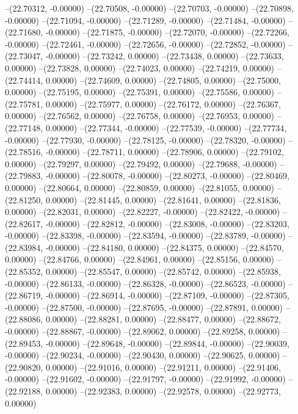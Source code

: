 --(22.70312, -0.00000)
--(22.70508, -0.00000)
--(22.70703, -0.00000)
--(22.70898, -0.00000)
--(22.71094, -0.00000)
--(22.71289, -0.00000)
--(22.71484, -0.00000)
--(22.71680, -0.00000)
--(22.71875, -0.00000)
--(22.72070, -0.00000)
--(22.72266, -0.00000)
--(22.72461, -0.00000)
--(22.72656, -0.00000)
--(22.72852, -0.00000)
--(22.73047, -0.00000)
--(22.73242, 0.00000)
--(22.73438, 0.00000)
--(22.73633, 0.00000)
--(22.73828, 0.00000)
--(22.74023, 0.00000)
--(22.74219, 0.00000)
--(22.74414, 0.00000)
--(22.74609, 0.00000)
--(22.74805, 0.00000)
--(22.75000, 0.00000)
--(22.75195, 0.00000)
--(22.75391, 0.00000)
--(22.75586, 0.00000)
--(22.75781, 0.00000)
--(22.75977, 0.00000)
--(22.76172, 0.00000)
--(22.76367, 0.00000)
--(22.76562, 0.00000)
--(22.76758, 0.00000)
--(22.76953, 0.00000)
--(22.77148, 0.00000)
--(22.77344, -0.00000)
--(22.77539, -0.00000)
--(22.77734, -0.00000)
--(22.77930, -0.00000)
--(22.78125, -0.00000)
--(22.78320, -0.00000)
--(22.78516, -0.00000)
--(22.78711, 0.00000)
--(22.78906, 0.00000)
--(22.79102, 0.00000)
--(22.79297, 0.00000)
--(22.79492, 0.00000)
--(22.79688, -0.00000)
--(22.79883, -0.00000)
--(22.80078, -0.00000)
--(22.80273, -0.00000)
--(22.80469, 0.00000)
--(22.80664, 0.00000)
--(22.80859, 0.00000)
--(22.81055, 0.00000)
--(22.81250, 0.00000)
--(22.81445, 0.00000)
--(22.81641, 0.00000)
--(22.81836, 0.00000)
--(22.82031, 0.00000)
--(22.82227, -0.00000)
--(22.82422, -0.00000)
--(22.82617, -0.00000)
--(22.82812, -0.00000)
--(22.83008, -0.00000)
--(22.83203, -0.00000)
--(22.83398, -0.00000)
--(22.83594, -0.00000)
--(22.83789, -0.00000)
--(22.83984, -0.00000)
--(22.84180, 0.00000)
--(22.84375, 0.00000)
--(22.84570, 0.00000)
--(22.84766, 0.00000)
--(22.84961, 0.00000)
--(22.85156, 0.00000)
--(22.85352, 0.00000)
--(22.85547, 0.00000)
--(22.85742, 0.00000)
--(22.85938, -0.00000)
--(22.86133, -0.00000)
--(22.86328, -0.00000)
--(22.86523, -0.00000)
--(22.86719, -0.00000)
--(22.86914, -0.00000)
--(22.87109, -0.00000)
--(22.87305, -0.00000)
--(22.87500, -0.00000)
--(22.87695, -0.00000)
--(22.87891, 0.00000)
--(22.88086, 0.00000)
--(22.88281, 0.00000)
--(22.88477, 0.00000)
--(22.88672, -0.00000)
--(22.88867, -0.00000)
--(22.89062, 0.00000)
--(22.89258, 0.00000)
--(22.89453, -0.00000)
--(22.89648, -0.00000)
--(22.89844, -0.00000)
--(22.90039, -0.00000)
--(22.90234, -0.00000)
--(22.90430, 0.00000)
--(22.90625, 0.00000)
--(22.90820, 0.00000)
--(22.91016, 0.00000)
--(22.91211, 0.00000)
--(22.91406, -0.00000)
--(22.91602, -0.00000)
--(22.91797, -0.00000)
--(22.91992, -0.00000)
--(22.92188, 0.00000)
--(22.92383, 0.00000)
--(22.92578, 0.00000)
--(22.92773, 0.00000)

